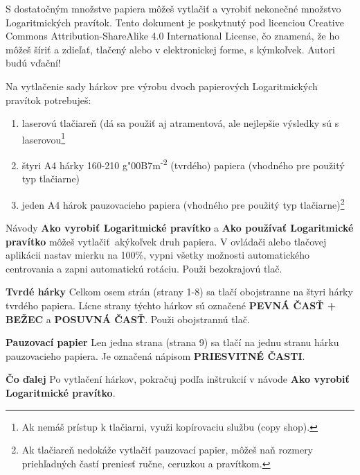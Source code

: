   \begin{multicols*}{3}
  \normalsize{

  S dostatočným množstve papiera môžeš vytlačiť a vyrobiť nekonečné množstvo Logaritmických pravítok. Tento dokument je poskytnutý pod licenciou Creative Commons Attribution-ShareAlike 4.0 International License, čo znamená, že ho môžeš šíriť a zdieľať, tlačený alebo v elektronickej forme, s kýmkoľvek. Autori budú vďační!

  Na vytlačenie sady hárkov pre výrobu dvoch papierových Logaritmických pravítok potrebuješ:
    \begin{enumerate}
      \setlength{\parskip}{0pt}
      \setlength{\parsep}{0pt}
      \item laserovú tlačiareň (dá sa použiť aj atramentová, ale nejlepšie výsledky sú s laserovou\footnote{Ak nemáš prístup k tlačiarni, využi kopírovaciu službu (copy shop).}
      \item štyri A4 hárky 160-210 g{\char"00B7}m\textsuperscript{-2} (tvrdého) papiera (vhodného pre použitý typ tlačiarne)
      \item jeden A4 hárok pauzovacieho papiera (vhodného pre použitý typ tlačiarne)\footnote{Ak tlačiareň nedokáže vytlačiť pauzovací papier, môžeš naň rozmery priehľadných častí preniesť ručne, ceruzkou a pravítkom.}
    \end{enumerate}

  Návody \textbf{Ako vyrobiť Logaritmické pravítko} a \textbf{Ako používať Logaritmické pravítko} môžeš vytlačiť akýkoľvek druh papiera. V ovládači alebo tlačovej aplikácii nastav mierku na 100\%, vypni všetky možnosti automatického centrovania a zapni automatickú rotáciu. Použi bezokrajovú tlač.

  \textbf{Tvrdé hárky}
Celkom osem strán (strany 1-8) sa tlačí obojstranne na štyri hárky tvrdého papiera. Lícne strany týchto hárkov sú označené \textbf{PEVNÁ ČASŤ + BEŽEC} a \textbf{POSUVNÁ ČASŤ}. Použi obojstrannú tlač.

  \textbf{Pauzovací papier}
Len jedna strana (strana 9) sa tlačí na jednu stranu hárku pauzovacieho papiera. Je označená nápisom \textbf{PRIESVITNÉ ČASTI}.

  \textbf{Čo ďalej}
Po vytlačení hárkov, pokračuj podľa inštrukcií v návode \textbf{Ako vyrobiť Logaritmické pravítko}.

  }
  \end{multicols*}
  

